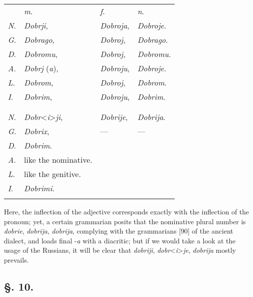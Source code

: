 \begin{longtable}{ l l l l }    
    \lsptoprule
    \multicolumn{4}{ c }{Singular.} \\
    \midrule
    & \textit{m}. & \textit{f}. & \textit{n}. \\
    \textit{N}. & \textit{Dobrji}, & \textit{Dobroja}, & \textit{Dobroje}. \\
    \textit{G}. & \textit{Dobrago}, & \textit{Dobroj}, & \textit{Dobrago}. \\
    \textit{D}. & \textit{Dobromu}, & \textit{Dobroj}, & \textit{Dobromu}. \\
    \textit{A}. & \textit{Dobrj} (\textit{a}), & \textit{Dobroju}, & \textit{Dobroje}. \\
    \textit{L}. & \textit{Dobrom}, & \textit{Dobroj}, & \textit{Dobrom}. \\
    \textit{I}. & \textit{Dobrim}, & \textit{Dobroju}, & \textit{Dobrim}. \\
    \lspbottomrule
    \\
    \lsptoprule
    \multicolumn{4}{ c }{Plural.} \\
    \midrule
    \textit{N}. & \textit{Dobr}<\textit{i}>\textit{ji}, & \textit{Dobrije}, & \textit{Dobrija}. \\
    \textit{G}. & \textit{Dobrix}, & — & — \\
    \textit{D}. & \textit{Dobrim}. & & \\
    \textit{A}. & like the nominative. & & \\
    \textit{L}. & like the genitive. & &  \\
    \textit{I}. & \textit{Dobrimi}. & & \\
    \lspbottomrule
\end{longtable}

Here, the inflection of the adjective corresponds exactly with the inflection of the pronoun; yet, a certain grammarian posits that the nominative plural number is \textit{dobrie}, \textit{dobrija}, \textit{dobrija}, complying with the grammarians [90] of the ancient dialect, and loads final -\textit{a} with a diacritic; but if we would take a look at the usage of the Russians, it will be clear that \textit{dobriji}, \textit{dobr}<\textit{i}>\textit{je}, \textit{dobrija} mostly prevails.

\subsection*{\hspace*{\fill}§. 10.\hspace*{\fill}}

